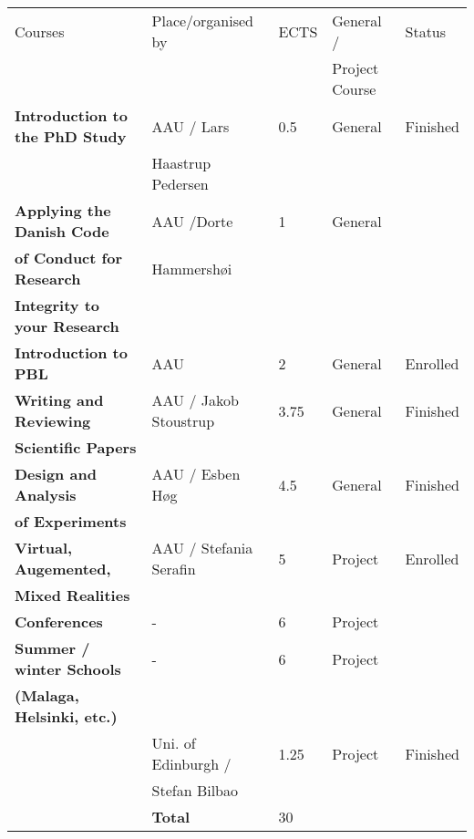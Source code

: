 \begin{tabular}{|l|l|l|l|l|}
\hline
   Courses  & Place/organised by & ECTS & General / & Status \\
   & & & Project Course & \\
   \hline
   
\rowcolor{lightestblue} \bf Introduction to the PhD Study & AAU / Lars & 0.5 & General &  Finished \\ 
\rowcolor{lightestblue} & Haastrup Pedersen & & & \\ 
\bf Applying the Danish Code & AAU /Dorte & 1 & General & \\ \bf of Conduct for Research & Hammersh\o i  & & & \\ \bf 
 Integrity to your Research & & & & \\ 
\rowcolor{lightestblue}\bf Introduction to PBL & AAU & 2 & General & Enrolled \\ \bf 
   Writing and Reviewing & AAU / Jakob Stoustrup & 3.75 & General & Finished \\ \bf 
   Scientific Papers & & & & \\
\rowcolor{lightestblue} \bf Design and Analysis& AAU / Esben H\o g & 4.5 & General & Finished\\
\rowcolor{lightestblue} \bf  of Experiments & & & & \\ 
\bf Virtual, Augemented, & AAU / Stefania Serafin & 5 & Project & Enrolled\\ \bf 
    Mixed Realities & & & &\\
    \rowcolor{lightestblue} \bf Conferences & - & 6 & Project & \\ \bf 
  Summer / winter Schools & - & 6 & Project & \\ \bf 
 (Malaga, Helsinki, etc.) & & & &\\ 
 \rowcolor{lightestblue} \bf {} & Uni. of Edinburgh / &  1.25 & Project & Finished \\ 
\rowcolor{lightestblue} \bf {} & Stefan Bilbao & & &\\
& \bf Total & 30 & & \\
    \hline
\end{tabular}

